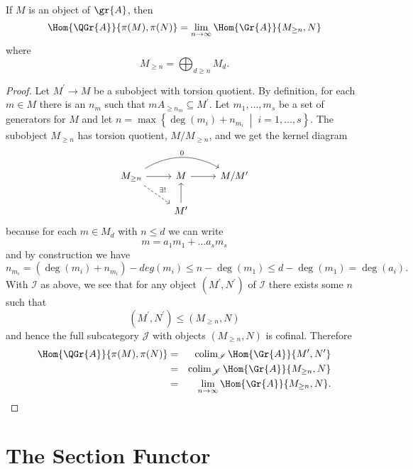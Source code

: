 \documentclass[10pt]{amsart}
\begin{document}
\begin{prop}
  If $M$ is an object of $\gr{A}$, then 
  $$\Hom{\QGr{A}}{\pi(M), \pi(N)} = \lim_{n \rightarrow \infty} \Hom{\Gr{A}}{M_{\geq n}, N}$$
  where 
  $$M_{\geq n} = \bigoplus_{d \geq n} M_d.$$
  \begin{proof}
    Let $M^\prime \rightarrow M$ be a subobject with torsion quotient.
    By definition, for each $m \in M$ there is an $n_m$ such that $mA_{\geq n_m} \subseteq M^\prime$.
    Let $m_1, \ldots, m_s$ be a set of generators for $M$ and let $n = \max\left\{\deg(m_i) + n_{m_i} \;\middle\vert\; i = 1, \ldots , s\right\}$.
    The subobject $M_{\geq n}$ has torsion quotient, $M/M_{\geq n}$, and we get the kernel diagram
    $$\begin{tikzcd}
      M_{\geq n} \arrow[bend left]{rr}{0} \arrow[dashed]{rd}{\exists !}\arrow{r} & M \arrow{r} & M/M^\prime\\
      & M^\prime \arrow{u}
    \end{tikzcd}$$
    because for each $m \in M_{d}$ with $n \leq d$ we can write
    $$m = a_1m_1 + \ldots a_sm_s$$
    and by construction we have
    $$n_{m_i} = (\deg(m_i) + n_{m_i}) - deg(m_i) \leq n - \deg(m_1) \leq d - \deg(m_1) = \deg(a_i).$$
    With $\mathscr{I}$ as above, we see that for any object $(M^\prime, N^\prime)$ of $\mathscr{I}$ there exists some $n$ such that
    $$(M^\prime, N^\prime) \leq (M_{\geq n}, N)$$
    and hence the full subcategory $\mathscr{J}$ with objects $(M_{\geq n}, N)$ is cofinal.
    Therefore
    \begin{eqnarray*}
      \Hom{\QGr{A}}{\pi(M), \pi(N)} &=& \operatorname{colim}_{\mathscr{I}}\Hom{\Gr{A}}{M^\prime, N^\prime}\\
      &=& \operatorname{colim}_{\mathscr{J}}\Hom{\Gr{A}}{M_{\geq n}, N}\\
      &=& \lim_{n \rightarrow \infty} \Hom{\Gr{A}}{M_{\geq n}, N}.
    \end{eqnarray*}
  \end{proof}
\end{prop}

\section{The Section Functor}
\end{document}
